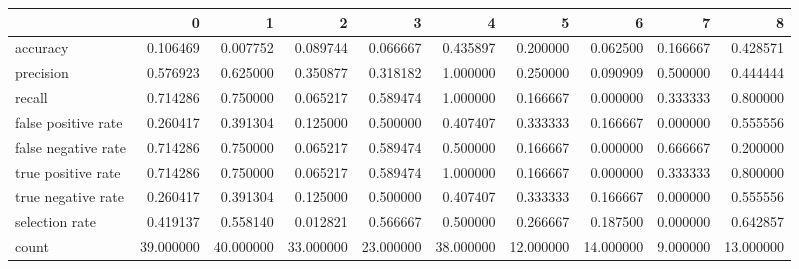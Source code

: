 \begin{tabular}{lrrrrrrrrr}
\toprule
{} &          0 &          1 &          2 &          3 &          4 &          5 &          6 &         7 &          8 \\
\midrule
accuracy            &   0.106469 &   0.007752 &   0.089744 &   0.066667 &   0.435897 &   0.200000 &   0.062500 &  0.166667 &   0.428571 \\
precision           &   0.576923 &   0.625000 &   0.350877 &   0.318182 &   1.000000 &   0.250000 &   0.090909 &  0.500000 &   0.444444 \\
recall              &   0.714286 &   0.750000 &   0.065217 &   0.589474 &   1.000000 &   0.166667 &   0.000000 &  0.333333 &   0.800000 \\
false positive rate &   0.260417 &   0.391304 &   0.125000 &   0.500000 &   0.407407 &   0.333333 &   0.166667 &  0.000000 &   0.555556 \\
false negative rate &   0.714286 &   0.750000 &   0.065217 &   0.589474 &   0.500000 &   0.166667 &   0.000000 &  0.666667 &   0.200000 \\
true positive rate  &   0.714286 &   0.750000 &   0.065217 &   0.589474 &   1.000000 &   0.166667 &   0.000000 &  0.333333 &   0.800000 \\
true negative rate  &   0.260417 &   0.391304 &   0.125000 &   0.500000 &   0.407407 &   0.333333 &   0.166667 &  0.000000 &   0.555556 \\
selection rate      &   0.419137 &   0.558140 &   0.012821 &   0.566667 &   0.500000 &   0.266667 &   0.187500 &  0.000000 &   0.642857 \\
count               &  39.000000 &  40.000000 &  33.000000 &  23.000000 &  38.000000 &  12.000000 &  14.000000 &  9.000000 &  13.000000 \\
\bottomrule
\end{tabular}
